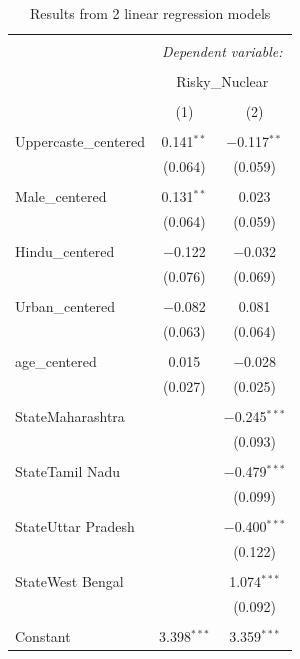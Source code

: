 \documentclass[
]{article}
\begin{document}
\begin{table}[!htbp] \centering 
  \caption{Results from 2 linear regression models} 
  \label{} 
\begin{tabular}{@{\extracolsep{5pt}}lcc} 
\\[-1.8ex]\hline 
\hline \\[-1.8ex] 
 & \multicolumn{2}{c}{\textit{Dependent variable:}} \\ 
\cline{2-3} 
\\[-1.8ex] & \multicolumn{2}{c}{Risky\_Nuclear} \\ 
\\[-1.8ex] & (1) & (2)\\ 
\hline \\[-1.8ex] 
 Uppercaste\_centered & 0.141$^{**}$ & $-$0.117$^{**}$ \\ 
  & (0.064) & (0.059) \\ 
  & & \\ 
 Male\_centered & 0.131$^{**}$ & 0.023 \\ 
  & (0.064) & (0.059) \\ 
  & & \\ 
 Hindu\_centered & $-$0.122 & $-$0.032 \\ 
  & (0.076) & (0.069) \\ 
  & & \\ 
 Urban\_centered & $-$0.082 & 0.081 \\ 
  & (0.063) & (0.064) \\ 
  & & \\ 
 age\_centered & 0.015 & $-$0.028 \\ 
  & (0.027) & (0.025) \\ 
  & & \\ 
 StateMaharashtra &  & $-$0.245$^{***}$ \\ 
  &  & (0.093) \\ 
  & & \\ 
 StateTamil Nadu &  & $-$0.479$^{***}$ \\ 
  &  & (0.099) \\ 
  & & \\ 
 StateUttar Pradesh &  & $-$0.400$^{***}$ \\ 
  &  & (0.122) \\ 
  & & \\ 
 StateWest Bengal &  & 1.074$^{***}$ \\ 
  &  & (0.092) \\ 
  & & \\ 
 Constant & 3.398$^{***}$ & 3.359$^{***}$ \\ 

\end{tabular}
\end{table}
\end{document}
